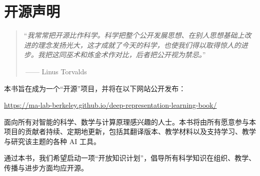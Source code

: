 \documentclass[../../book-main_zh.tex]{subfiles}
\begin{document}
\chapter*{开源声明}


\begin{quote}
    ``{\em 我常常把开源比作科学。科学把整个公开发展思想、在别人思想基础上改进的理念发扬光大，这才成就了今天的科学，也使我们得以取得惊人的进步。我把这同巫术和炼金术作对比，后者把公开视为禁忌。}''
    
 $~$\hfill —— Linus Torvalds
\end{quote}
\vspace{5mm}

本书旨在成为一个“开源”项目，并将在以下网站公开发布：
\begin{center}
    \url{https://ma-lab-berkeley.github.io/deep-representation-learning-book/}
\end{center}
面向所有对智能的科学、数学与计算原理感兴趣的人士。本书将由所有愿意参与本项目的贡献者持续、定期地更新，包括其翻译版本、教学材料以及支持学习、教学与研究该主题的各种 AI 工具。

通过本书，我们希望启动一项“开放知识计划”，倡导所有科学知识在组织、教学、传播与进步方面均应开源。
\end{document}
